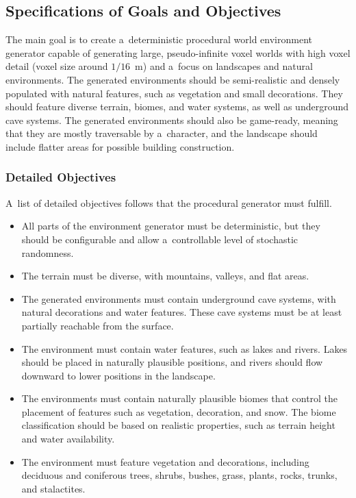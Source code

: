 \subsection{Specifications of Goals and Objectives}
The main goal is to create a~deterministic procedural world environment generator capable of generating large, pseudo-infinite voxel worlds with high voxel detail (voxel size around $1/16$~m) and a~focus on landscapes and natural environments. The generated environments should be semi-realistic and densely populated with natural features, such as vegetation and small decorations. They should feature diverse terrain, biomes, and water systems, as well as underground cave systems. The generated environments should also be game-ready, meaning that they are mostly traversable by a~character, and the landscape should include flatter areas for possible building construction.


\subsubsection{Detailed Objectives}
A~list of detailed objectives follows that the procedural generator must fulfill.

\begin{itemize}
    \item All parts of the environment generator must be deterministic, but they should be configurable and allow a~controllable level of stochastic randomness.
    \item The terrain must be diverse, with mountains, valleys, and flat areas.
    \item The generated environments must contain underground cave systems, with natural decorations and water features. These cave systems must be at least partially reachable from the surface.
    \item The environment must contain water features, such as lakes and rivers. Lakes should be placed in naturally plausible positions, and rivers should flow downward to lower positions in the landscape.
    \item The environments must contain naturally plausible biomes that control the placement of features such as vegetation, decoration, and snow. The biome classification should be based on realistic properties, such as terrain height and water availability.
    \item The environment must feature vegetation and decorations, including deciduous and coniferous trees, shrubs, bushes, grass, plants, rocks, trunks, and stalactites.
    
\end{itemize}

